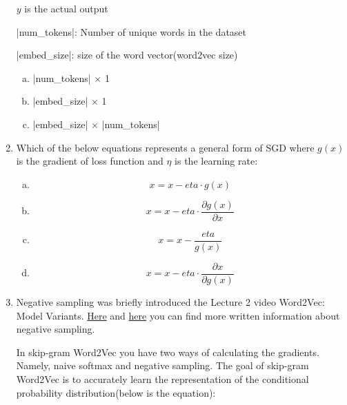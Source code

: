 \begin{enumerate}[1.]
$y$ is the actual output

|num_tokens|: Number of unique words in the dataset

|embed_size|: size of the word vector(word2vec size)

\begin{enumerate}[(a)]
\item |num_tokens| $\times$ 1
\item |embed_size| $\times$ 1
\item |embed_size| $\times$ |num_tokens|
\end{enumerate}


\item {}
Which of the below equations represents a general form of SGD where $g(x)$ is the gradient of loss function and $\eta$ is the learning rate:

\begin{enumerate}[(a)]
\item \begin{equation*}x = {x - eta \cdot g(x)}\end{equation*}
\item \begin{equation*}x = {x - eta \cdot \frac{\partial g(x)}{\partial x}}\end{equation*}
\item \begin{equation*}x = {x - \frac{eta}{g(x)}}\end{equation*}
\item \begin{equation*}x = {x - eta \cdot {\frac{\partial x}{\partial g(x)}}}\end{equation*}
\end{enumerate}


\item {}
Negative sampling was briefly introduced the Lecture 2 video Word2Vec: Model Variants. \href{https://stackoverflow.com/questions/27860652/word2vec-negative-sampling-in-layman-term#answer-27864657}{Here} and \href{https://www.quora.com/What-is-negative-sampling}{here} you can find more written information about negative sampling. 

In skip-gram Word2Vec you have two ways of calculating the gradients. Namely, naive softmax and negative sampling. The goal of skip-gram Word2Vec is to accurately learn the representation of the conditional probability distribution(below is the equation):


\end{enumerate}
